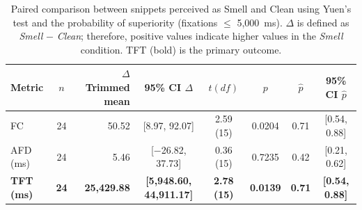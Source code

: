\begin{table}[!tp]
    \centering
    \footnotesize
    \caption{Paired comparison between snippets perceived as Smell and Clean using Yuen's test and the probability of superiority (fixations $\leq$ 5,000~ms). $\Delta$ is defined as \textit{Smell} $-$ \textit{Clean}; therefore, positive values indicate higher values in the \textit{Smell} condition. TFT (bold) is the primary outcome.}
    \label{tab:smell_clean_yuen_phat}
    \setlength{\tabcolsep}{5pt}
    \renewcommand{\arraystretch}{1.2}
    \begin{tabular}{l c r c c c c c}
        \toprule
        \textbf{Metric} & \textbf{$n$} & \textbf{$\Delta$ Trimmed mean} & \textbf{95\% CI $\Delta$} &
        \textbf{$t(df)$} & \textbf{$p$} & \textbf{$\hat{p}$} & \textbf{95\% CI $\hat{p}$} \\
        \midrule
        FC & 24 & 50.52 & [8.97, 92.07] & 2.59 (15) & 0.0204 & 0.71 & [0.54, 0.88] \\
        AFD (ms) & 24 & 5.46 & [$-$26.82, 37.73] & 0.36 (15) & 0.7235 & 0.42 & [0.21, 0.62] \\
        \textbf{TFT (ms)} & \textbf{24} & \textbf{25,429.88} & \textbf{[5,948.60, 44,911.17]} & \textbf{2.78 (15)} & \textbf{0.0139} & \textbf{0.71} & \textbf{[0.54, 0.88]} \\
        \bottomrule
    \end{tabular}
\end{table}
